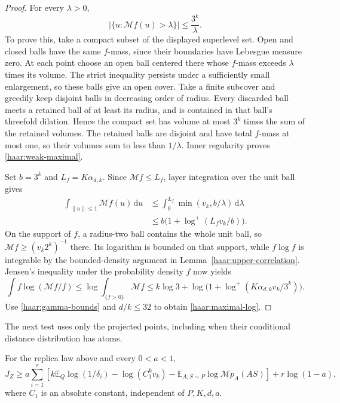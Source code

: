 \begin{proof}
For every $\lambda>0$,
\begin{equation}\label{haar:weak-maximal}
 \bigl|\{u:\mathcal M f(u)>\lambda\}\bigr|
       \le\frac{3^k}{\lambda}.
\end{equation}
To prove this, take a compact subset of the displayed superlevel set.
Open and closed balls have the same $f$-mass, since their boundaries have
Lebesgue measure zero.
At each point choose an open ball centered there whose $f$-mass exceeds
$\lambda$ times its volume.  The strict inequality persists under a
sufficiently small enlargement, so these balls give an open cover.
Take a finite subcover and greedily keep disjoint balls in decreasing
order of radius.  Every discarded ball meets a retained ball of at least
its radius, and is contained in that ball's threefold dilation.  Hence
the compact set has volume at most $3^k$ times the sum of the retained
volumes.  The retained balls are disjoint and have total $f$-mass at most
one, so their volumes sum to less than $1/\lambda$.  Inner regularity
proves \eqref{haar:weak-maximal}.

Set $b=3^k$ and $L_f=K\alpha_{d,k}$.  Since $\mathcal M f\le L_f$,
layer integration over the unit ball gives
\begin{align*}
 \int_{\lVert u\rVert\le1}\mathcal M f(u)\,\mathrm du
 &\le\int_0^{L_f}\min(v_k,b/\lambda)\,\mathrm d\lambda\\
 &\le b\bigl(1+\log^+(L_fv_k/b)\bigr).
\end{align*}
On the support of $f$, a radius-two ball contains the whole unit ball,
so $\mathcal M f\ge(v_k2^k)^{-1}$ there.  Its logarithm is bounded on
that support, while $f\log f$ is integrable by the bounded-density
argument in Lemma~\ref{haar:upper-correlation}.  Jensen's inequality
under the probability density $f$ now yields
\[
 \int f\log(\mathcal M f/f)
 \le\log\int_{\{f>0\}}\mathcal M f
 \le k\log3+\log\bigl(1+\log^+(K\alpha_{d,k}v_k/3^k)\bigr).
\]
Use \eqref{haar:gamma-bounds} and $d/k\le32$ to obtain
\eqref{haar:maximal-log}.
\end{proof}

The next test uses only the projected points, including when their
conditional distance distribution has atoms.

\begin{lemma}\label{haar:lower-correlation}
For the replica law above and every $0<a<1$,
\begin{equation}\label{haar:lower-Z}
 J_Z\ge a\sum_{i=1}^r\left[
       k\mathbb E_Q\log(1/\delta_i)-\log(C_1^kv_k)
       -\mathbb E_{A,S\sim P}\log\mathcal M p_A(AS)\right]
       +r\log(1-a),
\end{equation}
where $C_1$ is an absolute constant, independent of $P,K,d,a$.
\end{lemma}

